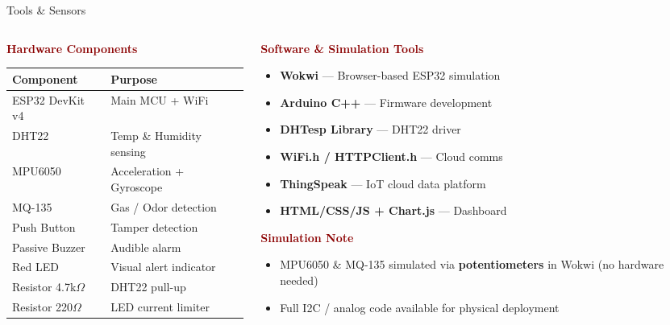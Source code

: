 \documentclass[aspectratio=169, 10pt]{beamer}
\begin{document}
\begin{frame}[shrink=3]{Tools \& Sensors}
  \begin{columns}[T]
    \begin{column}{0.5\textwidth}
      \textbf{\textcolor{darkred}{Hardware Components}}
      \vspace{0.2em}
      {\small
      \begin{tabular}{@{}ll@{}}
        \toprule
        \textbf{Component} & \textbf{Purpose} \\
        \midrule
        ESP32 DevKit v4 & Main MCU + WiFi \\
        DHT22 & Temp \& Humidity sensing \\
        MPU6050 & Acceleration + Gyroscope \\
        MQ-135 & Gas / Odor detection \\
        Push Button & Tamper detection \\
        Passive Buzzer & Audible alarm \\
        Red LED & Visual alert indicator \\
        Resistor 4.7k$\Omega$ & DHT22 pull-up \\
        Resistor 220$\Omega$ & LED current limiter \\
        \bottomrule
      \end{tabular}
      }
    \end{column}
    \begin{column}{0.5\textwidth}
      \textbf{\textcolor{darkred}{Software \& Simulation Tools}}
      \begin{itemize}\setlength\itemsep{0.28em}
        \item \textbf{Wokwi} — Browser-based ESP32 simulation
        \item \textbf{Arduino C++} — Firmware development
        \item \textbf{DHTesp Library} — DHT22 driver
        \item \textbf{WiFi.h / HTTPClient.h} — Cloud comms
        \item \textbf{ThingSpeak} — IoT cloud data platform
        \item \textbf{HTML/CSS/JS + Chart.js} — Dashboard
      \end{itemize}
      \vspace{0.35em}
      \textbf{\textcolor{darkred}{Simulation Note}}
      \begin{itemize}\setlength\itemsep{0.2em}
        \item MPU6050 \& MQ-135 simulated via \textbf{potentiometers} in Wokwi (no hardware needed)
        \item Full I2C / analog code available for physical deployment
      \end{itemize}
    \end{column}
  \end{columns}
\end{frame}
\end{document}
